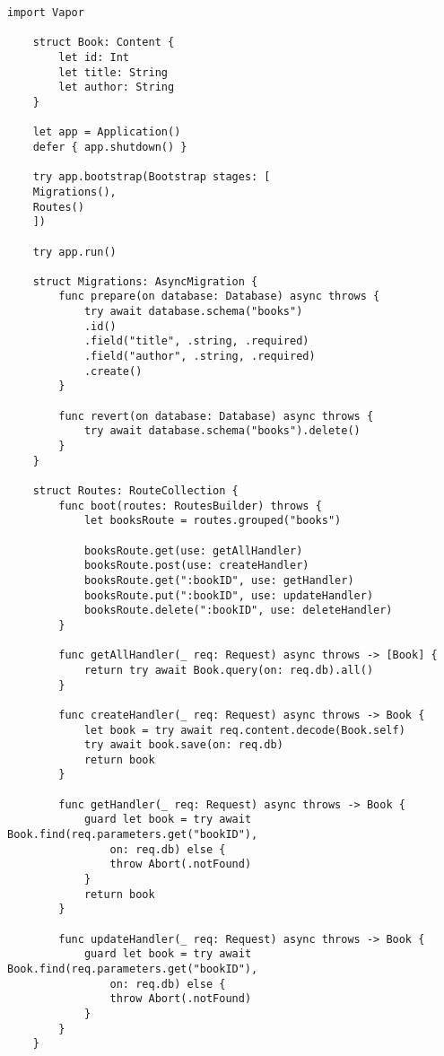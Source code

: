 \begin{lstlisting}[caption=Vapor example]
    import Vapor
    
    struct Book: Content {
        let id: Int
        let title: String
        let author: String
    }
    
    let app = Application()
    defer { app.shutdown() }
    
    try app.bootstrap(Bootstrap stages: [
    Migrations(),
    Routes()
    ])
    
    try app.run()
    
    struct Migrations: AsyncMigration {
        func prepare(on database: Database) async throws {
            try await database.schema("books")
            .id()
            .field("title", .string, .required)
            .field("author", .string, .required)
            .create()
        }
        
        func revert(on database: Database) async throws {
            try await database.schema("books").delete()
        }
    }
    
    struct Routes: RouteCollection {
        func boot(routes: RoutesBuilder) throws {
            let booksRoute = routes.grouped("books")
            
            booksRoute.get(use: getAllHandler)
            booksRoute.post(use: createHandler)
            booksRoute.get(":bookID", use: getHandler)
            booksRoute.put(":bookID", use: updateHandler)
            booksRoute.delete(":bookID", use: deleteHandler)
        }
        
        func getAllHandler(_ req: Request) async throws -> [Book] {
            return try await Book.query(on: req.db).all()
        }
        
        func createHandler(_ req: Request) async throws -> Book {
            let book = try await req.content.decode(Book.self)
            try await book.save(on: req.db)
            return book
        }
        
        func getHandler(_ req: Request) async throws -> Book {
            guard let book = try await Book.find(req.parameters.get("bookID"), 
                on: req.db) else {
                throw Abort(.notFound)
            }
            return book
        }
        
        func updateHandler(_ req: Request) async throws -> Book {
            guard let book = try await Book.find(req.parameters.get("bookID"), 
                on: req.db) else {
                throw Abort(.notFound)
            }
        }
    }
\end{lstlisting}
\newpage


